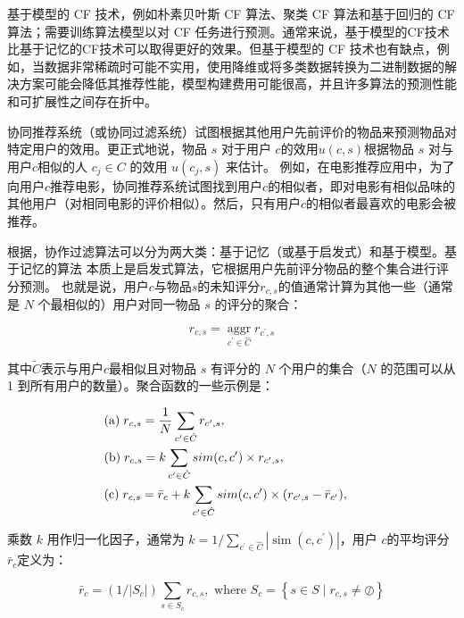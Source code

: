 \documentclass[sigconf]{acmart}
\begin{document}
基于模型的 CF 技术，例如朴素贝叶斯 CF 算法、聚类 CF 算法和基于回归的 CF 算法；需要训练算法模型以对 CF 任务进行预测。通常来说，基于模型的CF技术比基于记忆的CF技术可以取得更好的效果。但基于模型的 CF 技术也有缺点，例如，当数据非常稀疏时可能不实用，使用降维或将多类数据转换为二进制数据的解决方案可能会降低其推荐性能，模型构建费用可能很高，并且许多算法的预测性能和可扩展性之间存在折中。

协同推荐系统（或协同过滤系统）试图根据其他用户先前评价的物品来预测物品对特定用户的效用。更正式地说，物品 $s$ 对于用户 $c$的效用$u(c,s)$根据物品 $s$ 对与用户$c$相似的人 $c_j\in C$ 的效用 $u(c_j, s)$ 来估计。 例如，在电影推荐应用中，为了向用户$c$推荐电影，协同推荐系统试图找到用户$c$的相似者，即对电影有相似品味的其他用户（对相同电影的评价相似）。然后，只有用户$c$的相似者最喜欢的电影会被推荐。

根据\cite{breese2013empirical}，协作过滤算法可以分为两大类：基于记忆（或基于启发式）和基于模型。基于记忆的算法 \cite{breese2013empirical, delgado1999memory, nakamura1998collaborative, resnick1994grouplens,shardanand1995social}本质上是启发式算法，它根据用户先前评分物品的整个集合进行评分预测。 也就是说，用户$c$与物品$s$的未知评分$r_{c,s}$的值通常计算为其他一些（通常是 $N$ 个最相似的）用户对同一物品 $s$ 的评分的聚合：

\begin{equation}
  r_{c, s}=\underset{c^{\prime} \in \hat{C}}{\operatorname{aggr}} r_{c^{\prime}, s}
\end{equation}

其中$\tilde{C}$表示与用户$c$最相似且对物品 $s$ 有评分的 $N$ 个用户的集合（$N$ 的范围可以从 1 到所有用户的数量）。聚合函数的一些示例是：

\begin{equation}
  \begin{aligned}
    &{\rm{(a) }}\;r_{c, s} = {1 \over N}\sum\limits_{c^{\prime} \in \hat C}{r_{c^{\prime}, s}},\cr& {\rm{ (b) }}\;r_{c, s} = k\sum\limits_{c^{\prime} \in \hat C}{sim(c, c^{\prime}) \times r_{c^{\prime}, s}},\cr& {\rm{ (c) }}\;r_{c, s} = \bar r_c + k\sum\limits_{c^{\prime} \in \hat C}{sim(c, c^{\prime}) \times (r_{c^{\prime}, s} - \bar r_{c^{\prime}})},
  \end{aligned}
\end{equation}

乘数 $k$ 用作归一化因子，通常为 $k=1 / \sum_{c^{\prime} \in \hat{C}}\left|\operatorname{sim}\left(c, c^{\prime}\right)\right|$，用户 $c$的平均评分 $\bar{r}_{c}$定义为：

\begin{equation}
  \bar{r}_{c}=\left(1 /\left|S_{c}\right|\right) \sum_{s \in S_{c}} r_{c, s}, \text { where } S_{c}=\left\{s \in S \mid r_{c, s} \neq \oslash\right\}  
\end{equation}
\end{document}
